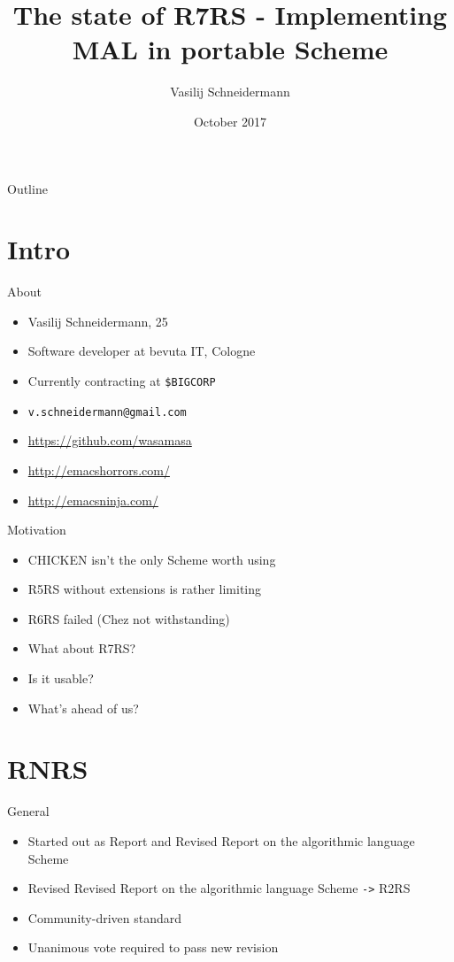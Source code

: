 \documentclass[presentation]{beamer}
\author{Vasilij Schneidermann}
\date{October 2017}
\title{The state of R7RS - Implementing MAL in portable Scheme}
\begin{document}
\maketitle
\begin{frame}{Outline}
\tableofcontents
\end{frame}

\AtBeginSection{\frame{\sectionpage}}

\section{Intro}
\label{sec-1}

\begin{frame}[fragile,label=sec-1-1]{About}
 \begin{itemize}
\item Vasilij Schneidermann, 25
\item Software developer at bevuta IT, Cologne
\item Currently contracting at \texttt{\$BIGCORP}
\item \texttt{v.schneidermann@gmail.com}
\item \url{https://github.com/wasamasa}
\item \url{http://emacshorrors.com/}
\item \url{http://emacsninja.com/}
\end{itemize}
\end{frame}

\begin{frame}[label=sec-1-2]{Motivation}
\begin{itemize}
\item CHICKEN isn't the only Scheme worth using
\item R5RS without extensions is rather limiting
\item R6RS failed (Chez not withstanding)
\item What about R7RS?
\item Is it usable?
\item What's ahead of us?
\end{itemize}
\end{frame}

\section{RNRS}
\label{sec-2}

\begin{frame}[fragile,label=sec-2-1]{General}
 \begin{itemize}
\item Started out as Report and Revised Report on the algorithmic language Scheme
\item Revised Revised Report on the algorithmic language Scheme \texttt{->} R2RS
\item Community-driven standard
\item Unanimous vote required to pass new revision
\end{itemize}
\end{frame}
\end{document}
